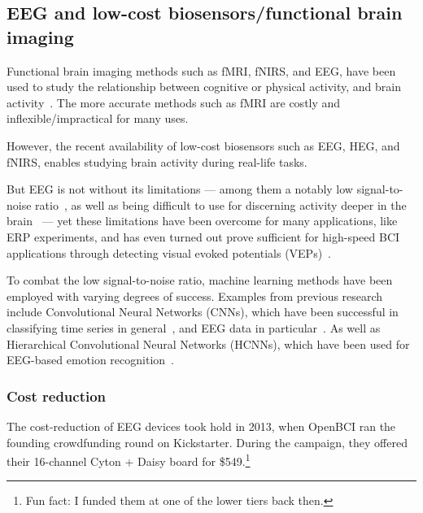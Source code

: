 \subsection{EEG and low-cost biosensors/functional brain imaging}

    Functional brain imaging methods such as fMRI, fNIRS, and EEG, have been used to study the relationship between cognitive or physical activity, and brain activity~\cite{floyd_decoding_2017}\cite{hong_classification_2015}\cite{fucci_replication_2019}. The more accurate methods such as fMRI are costly and inflexible/impractical for many uses.

    However, the recent availability of low-cost biosensors such as EEG, HEG, and fNIRS, enables studying brain activity during real-life tasks.

    But EEG is not without its limitations --- among them a notably low signal-to-noise ratio~\cite{mcfarland_eeg-based_2017}, as well as being difficult to use for discerning activity deeper in the brain~\cite{fahimi_hnazaee_localization_2020} --- yet these limitations have been overcome for many applications, like ERP experiments, and has even turned out prove sufficient for high-speed BCI applications through detecting visual evoked potentials (VEPs)~\cite{spuler_high-speed_2017}.

    To combat the low signal-to-noise ratio, machine learning methods have been employed with varying degrees of success. Examples from previous research include Convolutional Neural Networks (CNNs), which have been successful in classifying time series in general~\cite{zhao_convolutional_2017}, and EEG data in particular~\cite{schirrmeister_deep_2017}. As well as Hierarchical Convolutional Neural Networks (HCNNs), which have been used for EEG-based emotion recognition~\cite{li_hierarchical_2018}.


    \subsubsection{Cost reduction}

    The cost-reduction of EEG devices took hold in 2013, when OpenBCI ran the founding crowdfunding round on Kickstarter. During the campaign, they offered their 16-channel Cyton + Daisy board for \$549.\footnote{Fun fact: I funded them at one of the lower tiers back then.}\cite{noauthor_openbci_nodate}

